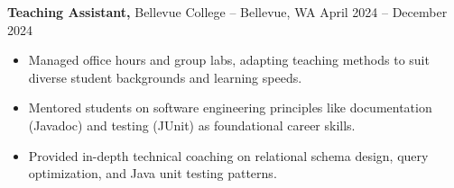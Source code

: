\documentclass[11pt]{article}       %
\begin{document}
\textbf{Teaching Assistant,} {Bellevue College} -- Bellevue, WA \hfill April 2024 -- December 2024 \\
\vspace{-9pt}
\begin{itemize}
  \item Managed office hours and group labs, adapting teaching methods to suit diverse student backgrounds and learning speeds.
  \item Mentored students on software engineering principles like documentation (Javadoc) and testing (JUnit) as foundational career skills.
  \item Provided in-depth technical coaching on relational schema design, query optimization, and Java unit testing patterns.
\end{itemize}

\end{document}
